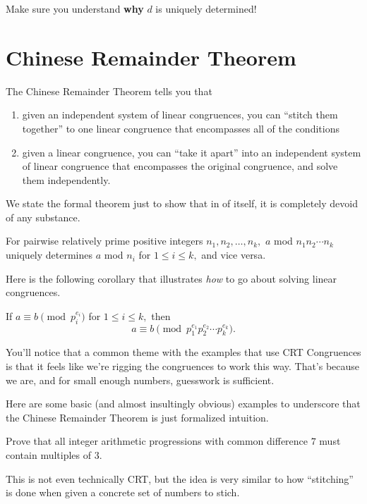 \documentclass{article}
\begin{document}
Make sure you understand \textbf{why} $d$ is uniquely determined!

\section{Chinese Remainder Theorem}
The Chinese Remainder Theorem tells you that
\begin{enumerate}
\item given an independent system of linear congruences, you can ``stitch them together'' to one linear congruence that encompasses all of the conditions
\item given a linear congruence, you can ``take it apart'' into an independent system of linear congruence that encompasses the original congruence, and solve them independently.
\end{enumerate}

We state the formal theorem just to show that in of itself, it is completely devoid of any substance.

\begin{theo}
For pairwise relatively prime positive integers $n_1,n_2,\ldots,n_k,$ $a$ mod $n_1n_2\cdots n_k$ uniquely determines $a$ mod $n_i$ for $1\leq i\leq k,$ and vice versa.
\end{theo}

Here is the following corollary that illustrates \textit{how} to go about solving linear congruences.

\begin{fact}
If $a\equiv b\pmod{p_i^{e_i}}$ for $1\leq i\leq k,$ then
\[a\equiv b\pmod{p_1^{e_1}p_2^{e_2}\cdots p_k^{e_k}}.\]
\end{fact}

You'll notice that a common theme with the examples that use CRT Congruences is that it feels like we're rigging the congruences to work this way. That's because we are, and for small enough numbers, guesswork is sufficient.

Here are some basic (and almost insultingly obvious) examples to underscore that the Chinese Remainder Theorem is just formalized intuition.

\begin{exam}
Prove that all integer arithmetic progressions with common difference $7$ must contain multiples of $3.$
\end{exam}

This is not even technically CRT, but the idea is very similar to how ``stitching'' is done when given a concrete set of numbers to stich.
\end{document}
